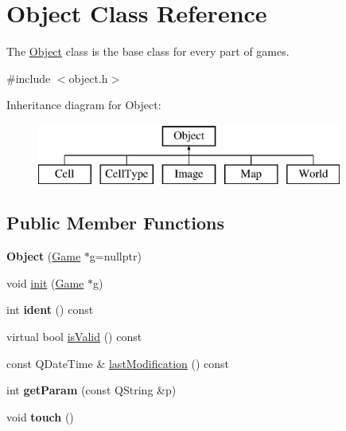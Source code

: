 \hypertarget{class_object}{\section{\-Object \-Class \-Reference}
\label{class_object}
}


\-The \hyperlink{class_object}{\-Object} class is the base class for every part of games.  




{\ttfamily \#include $<$object.\-h$>$}

\-Inheritance diagram for \-Object\-:\begin{figure}[H]
\begin{center}
\leavevmode
\includegraphics[height=2.000000cm]{class_object}
\end{center}
\end{figure}
\subsection*{\-Public \-Member \-Functions}
\begin{DoxyCompactItemize}
\item 
\hypertarget{class_object_acab6f688bc461241145d692a3e1eb7c3}{{\bfseries \-Object} (\hyperlink{class_game}{\-Game} $\ast$g=nullptr)}\label{class_object_acab6f688bc461241145d692a3e1eb7c3}

\item 
void \hyperlink{class_object_afa66336bbc104f8ffa0fdad930c864d2}{init} (\hyperlink{class_game}{\-Game} $\ast$g)
\item 
\hypertarget{class_object_af170b1d9340b79e8ef8f261d4667b2e8}{int {\bfseries ident} () const }\label{class_object_af170b1d9340b79e8ef8f261d4667b2e8}

\item 
virtual bool \hyperlink{class_object_a2ea6a84458109aea71c167ed01b6469d}{is\-Valid} () const 
\item 
const \-Q\-Date\-Time \& \hyperlink{class_object_aa37d8a2ecc8d63963ed62ba811e0ed90}{last\-Modification} () const 
\item 
\hypertarget{class_object_ad259e3b7740c10b5c0f542247e80320e}{int {\bfseries get\-Param} (const \-Q\-String \&p)}\label{class_object_ad259e3b7740c10b5c0f542247e80320e}

\item 
\hypertarget{class_object_a357b924d7e6c34d26959451f04b6755d}{void {\bfseries touch} ()}\label{class_object_a357b924d7e6c34d26959451f04b6755d}

\end{DoxyCompactItemize}
